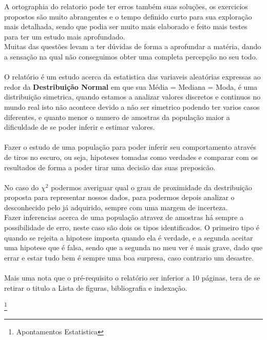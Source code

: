 A ortographia do relatorio pode ter erros também suas soluções, os exercicios propostos são muito abrangentes e o tempo definido curto para sua exploração mais detalhada, sendo que podia ser muito mais elaborado e feito mais testes para ter um estudo mais aprofundado. \\
Muitas das questões levam a ter dúvidas de forma a aprofundar a matéria, dando a sensação na qual não conseguimos obter uma completa percepção no seu todo. \\
\\
O relatório é um estudo acerca da estatistica das variaveis aleatórias expressas ao redor da \textbf{Destribuição Normal} em que sua Média = Mediana = Moda, é uma distribuição simetrica, quando estamos a analizar valores discretos e continuos no mundo real isto não acontece devido a não ser simetrico podendo ter varios casos diferentes, e quanto menor o numero de amostras da população maior a dificuldade de se poder inferir e estimar valores. \\
\\
Fazer o estudo de uma população para poder inferir seu comportamento através de tiros no escuro, ou seja, hipoteses tomadas como verdades e comparar com os resultados de forma a poder tirar uma decisão das suas preposicão. \\
\\ 
No caso do $\chi^2$ podermos averiguar qual o grau de proximidade da destribuição proposta para representar nossos dados, para podermos depois analizar o desconhecido pelo já adquirido, sempre com uma margem de incerteza.
\\
Fazer inferencias acerca de uma população atravez de amostras há sempre a possibilidade de erro, neste caso são dois os tipos identificados. O primeiro tipo é quando se rejeita a hipotese imposta quando ela é verdade, e a segunda aceitar uma hipotese que é falsa, sendo que a segunda no meu ver é mais grave, dado que errar e estar tudo bem é sempre uma boa surpresa, caso contrario um desastre. \\
\\
Mais uma nota que o pré-requisito o relatório ser inferior a 10 páginas, tera de se retirar o titulo a Lista de figuras, bibliografia e indexação. \\
\newpage

%
%
%
\listoffigures
\cite{*}

\footnote{Apontamentos Estatistica}

